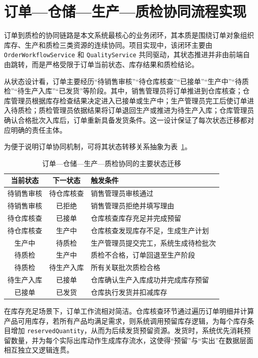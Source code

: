 \section{订单—仓储—生产—质检协同流程实现}

订单到质检的协同链路是本文系统最核心的业务闭环，其本质是围绕订单对象组织库存、生产和质检三类资源的连续协同。项目实现中，该闭环主要由 \texttt{OrderWorkflowService} 和 \texttt{QualityService} 共同驱动，其状态推进并非由前端自由跳转，而是严格受限于订单当前状态、库存结果和质检结论。

从状态设计看，订单主要经历“待销售审核”“待仓库核查”“已接单”“生产中”“待质检”“待生产入库”“已发货”等阶段。其中，销售管理员将订单推进到仓库核查；仓库管理员根据库存检查结果决定进入已接单或生产中；生产管理员完工后使订单进入待质检；质检管理员依据结果将订单退回生产或推进为待生产入库；仓库管理员确认合格批次入库后，订单重新具备发货条件。这一设计保证了每次状态迁移都对应明确的责任主体。

为便于说明订单协同机制，可将其状态转移关系抽象为表~\ref{tab:order-status-flow}。

\begin{table}[htbp]
\centering
\footnotesize
\caption{订单—仓储—生产—质检协同的主要状态迁移}
\label{tab:order-status-flow}
\begin{tabular}{|c|c|p{5.6cm}|}
\hline
当前状态 & 下一状态 & 触发条件 \\\hline
待销售审核 & 待仓库核查 & 销售管理员审核通过 \\\hline
待销售审核 & 已拒绝 & 销售管理员拒绝并填写理由 \\\hline
待仓库核查 & 已接单 & 仓库核查库存充足并完成预留 \\\hline
待仓库核查 & 生产中 & 仓库核查发现库存不足，生成生产计划 \\\hline
生产中 & 待质检 & 生产管理员提交完工，系统生成待检批次 \\\hline
待质检 & 生产中 & 质检不合格，订单回退至生产阶段 \\\hline
待质检 & 待生产入库 & 所有关联批次质检合格 \\\hline
待生产入库 & 已接单 & 仓库确认生产入库成功并完成库存预留 \\\hline
已接单 & 已发货 & 仓库执行发货并扣减库存 \\\hline
\end{tabular}
\end{table}

在库存充足场景下，订单工作流相对简洁。仓库核查环节通过遍历订单明细并计算产品可用库存，若所有产品均满足需求，则系统调用预留库存逻辑，为每个库存条目增加 \texttt{reservedQuantity}，从而为后续发货预留资源。发货时，系统优先消耗预留数量，并为每个实际出库动作生成库存流水，这使得“预留”与“实出”在数据层面相互独立又逻辑连贯。

